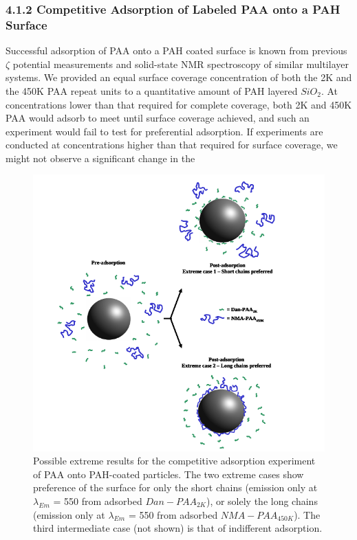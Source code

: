 \documentclass[journal=mamobx,manuscript=article]{achemso}
\begin{document}
\subsubsection{4.1.2 Competitive Adsorption of Labeled PAA onto a PAH Surface}

Successful adsorption of PAA onto a PAH coated surface is known from previous $\zeta$ potential measurements and solid-state NMR spectroscopy of similar multilayer systems.\cite{Burke2003,Smith2004}  We provided an equal surface coverage concentration of both the 2K and the 450K PAA repeat units to a quantitative amount of PAH layered $SiO_2$.  At concentrations lower than that required for complete coverage, both 2K and 450K PAA would adsorb to meet until surface coverage achieved, and such an experiment would fail to test for preferential adsorption.  If experiments are conducted at concentrations higher than that required for surface coverage, we might not observe a significant change in the 


\begin{figure}[H]
\includegraphics[scale=3.0]{fig4.png}
\caption{Possible extreme results for the competitive adsorption experiment of PAA onto PAH-coated particles.  The two extreme cases show preference of the surface for only the short chains (emission only at $\lambda_{Em}$ = 550 from adsorbed $Dan-PAA_{2K}$), or solely the long chains (emission only at $\lambda_{Em}$ = 550 from adsorbed $NMA-PAA_{450K}$).  The third intermediate case (not shown) is that of indifferent adsorption.}
\label{figure 4}
\end{figure}
\end{document}
